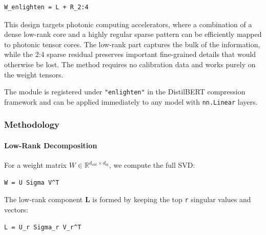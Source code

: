 \vspace{0.5em}
\begin{mdframed}[backgroundcolor=codebg, linecolor=codeframe, linewidth=1pt, roundcorner=4pt, innerleftmargin=2pt, innerrightmargin=5pt, innertopmargin=5pt, innerbottommargin=5pt]
\begin{lstlisting}
W_enlighten = L + R_2:4
\end{lstlisting}
\end{mdframed}
\vspace{0.5em}

This design targets photonic computing accelerators, where a combination of a dense low-rank core and a highly regular sparse pattern can be efficiently mapped to photonic tensor cores. The low-rank part captures the bulk of the information, while the 2:4 sparse residual preserves important fine-grained details that would otherwise be lost. The method requires no calibration data and works purely on the weight tensors.

The module is registered under \texttt{"enlighten"} in the DistilBERT compression framework and can be applied immediately to any model with \texttt{nn.Linear} layers.


\subsubsection*{Methodology}

\paragraph{Low-Rank Decomposition}

For a weight matrix $W \in \mathbb{R}^{d_{\text{out}} \times d_{\text{in}}}$, we compute the full SVD:

\vspace{0.5em}
\begin{mdframed}[backgroundcolor=codebg, linecolor=codeframe, linewidth=1pt, roundcorner=4pt, innerleftmargin=2pt, innerrightmargin=5pt, innertopmargin=5pt, innerbottommargin=5pt]
\begin{lstlisting}
W = U Sigma V^T
\end{lstlisting}
\end{mdframed}
\vspace{0.5em}

The low-rank component \textbf{L} is formed by keeping the top \texttt{r} singular values and vectors:

\vspace{0.5em}
\begin{mdframed}[backgroundcolor=codebg, linecolor=codeframe, linewidth=1pt, roundcorner=4pt, innerleftmargin=2pt, innerrightmargin=5pt, innertopmargin=5pt, innerbottommargin=5pt]
\begin{lstlisting}
L = U_r Sigma_r V_r^T
\end{lstlisting}
\end{mdframed}
\vspace{0.5em}

